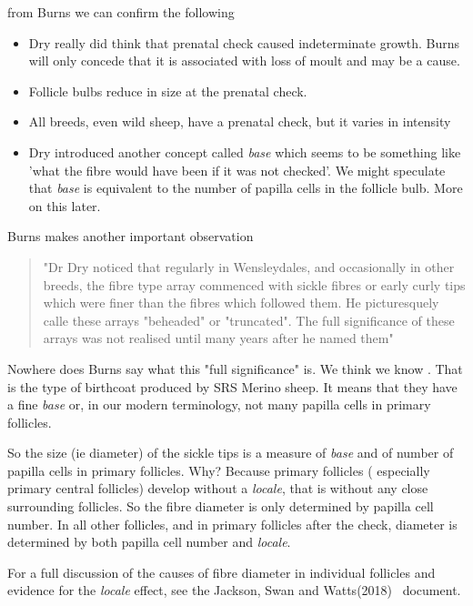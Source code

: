 \documentclass[titlepage]{article}  %
\begin{document}
 from Burns we can confirm the following
\begin{itemize}
\item Dry really did think that prenatal check caused indeterminate growth. Burns will only concede that it is associated with loss of moult and may be a cause.
\item Follicle bulbs reduce in size at the prenatal check. 
\item All breeds, even wild sheep, have a prenatal check, but it varies in intensity
\item Dry introduced another concept called {\em base}  which seems to be something like 'what the fibre would have been if it was not checked'. We might speculate that {\em base }  is equivalent to the number of papilla cells in the follicle bulb. More on this later.
\end{itemize} 

 Burns makes another important observation
\begin{quote}
"Dr Dry noticed that regularly in Wensleydales, and occasionally in other breeds, the fibre type array commenced with sickle fibres or early curly tips which were finer than the fibres which followed them. He picturesquely calle these arrays "beheaded" or "truncated". The full significance of these arrays was not realised until many years after he named them"
\end{quote}
Nowhere does Burns say what this "full significance" is.  We think we know . That is the type of birthcoat produced by SRS Merino sheep. It means that they have a fine {\em base} or, in our modern terminology, not many papilla cells in primary follicles. 

So the size  (ie diameter) of the sickle tips is a measure of {\em base} and of number of papilla cells in primary follicles.  Why? Because primary follicles ( especially primary central follicles) develop without a {\em locale}, that is without any close surrounding follicles. So the fibre diameter is only determined by papilla cell number. In all other follicles, and in primary follicles after the check, diameter is determined by both papilla cell number and {\em locale}.

For a full discussion of the causes of fibre diameter in individual follicles and evidence for the {\em locale} effect, see the Jackson, Swan and Watts(2018)~\cite{jackswan:18} document.
\end{document}
